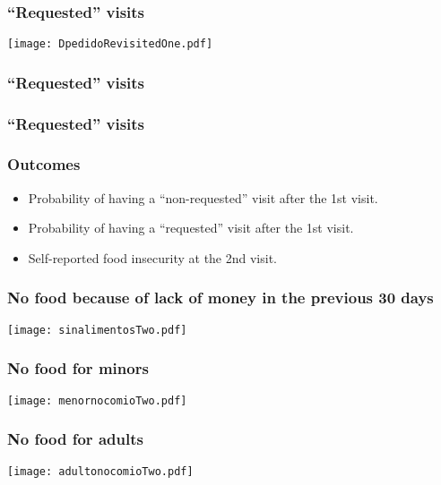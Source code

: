 \documentclass{beamer}
\begin{document}
\begin{frame}
\frametitle{``Requested'' visits}
\begin{center}
	\texttt{[image: DpedidoRevisitedOne.pdf]}
	\label{DpedidoRevisitedOne}
\end{center}
\end{frame}

\begin{frame}
\frametitle{``Requested'' visits}
\begin{figure}
	
\end{figure}
\end{frame}

\begin{frame}
\frametitle{``Requested'' visits}
\begin{figure}
	
\end{figure}
\end{frame}

\begin{frame}
\frametitle{Outcomes}
\begin{itemize}
	\item {\color{gray}Probability of having a ``non-requested'' visit after the 1st visit.}
	\item {\color{gray}Probability of having a ``requested'' visit after the 1st visit.}
	\item Self-reported food insecurity at the 2nd visit.
\end{itemize}
\end{frame}

\begin{frame}
\frametitle{No food because of lack of money in the previous 30 days}
\begin{center}
	\texttt{[image: sinalimentosTwo.pdf]}
	\label{sinalimentosTwo}
\end{center}
\end{frame}

\begin{frame}
\frametitle{No food for minors}
\begin{center}
\texttt{[image: menornocomioTwo.pdf]}
\label{menornocomioTwo}
\end{center}
\end{frame}

\begin{frame}
\frametitle{No food for adults}
\begin{center}
	\texttt{[image: adultonocomioTwo.pdf]}
	\label{adultonocomioTwo}
\end{center}
\end{frame}
\end{document}
